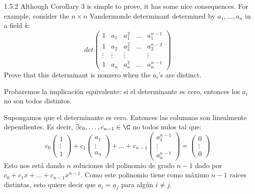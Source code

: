 \documentclass[twoside]{article}
\begin{document}
\begin{ejercicio}{1.5.2}
Although Corollary 3 is simple to prove, it has some nice consequences. For example, consider the $n \times n$ Vandermonde determinant determined by $a_1,\dots,a_n$ in a field $k$:
\[ det\begin{pmatrix}
1 & a_1 & a_1^2 & \dots & a_1^{n-1}\\
1 & a_2 & a_2^2 & \dots & a_2^{n-2}\\
\vdots & \vdots & \vdots & & \vdots\\
1 & a_n & a_n^2 & \dots & a_n^{n-1}
\end{pmatrix}\]
Prove that this determinant is nonzero when the $a_i$'s are distinct.
\end{ejercicio}
\begin{solucion}
Probaremos la implicación equivalente: si el determinante es cero, entonces los $a_i$ no son todos distintos.

Supongamos que el determinante es cero.
Entonces las columnas son linealmente dependientes.
Es decir, $\exists c_0,\dots,c_{n-1}\in \C$ no todos nulos tal que:
\[ c_0 \begin{pmatrix} 1\\\vdots\\1\end{pmatrix} + c_1\begin{pmatrix} a_1\\\vdots\\a_n\end{pmatrix}+ \dots + c_{n-1}\begin{pmatrix} a_1^{n-1}\\\vdots\\a_n^{n-1}\end{pmatrix} = \begin{pmatrix}0\\\vdots\\0\end{pmatrix}\]
Esto nos está dando $n$ soluciones del polinomio de grado $n-1$ dado por $c_0 + c_1 x + \dots + c_{n-1}x^{n-1}$.
Como este polinomio tiene como máximo $n-1$ raíces distintas, esto quiere decir que $a_i = a_j$ para algún $i \neq j$.
\end{solucion}

\newpage
\end{document}
